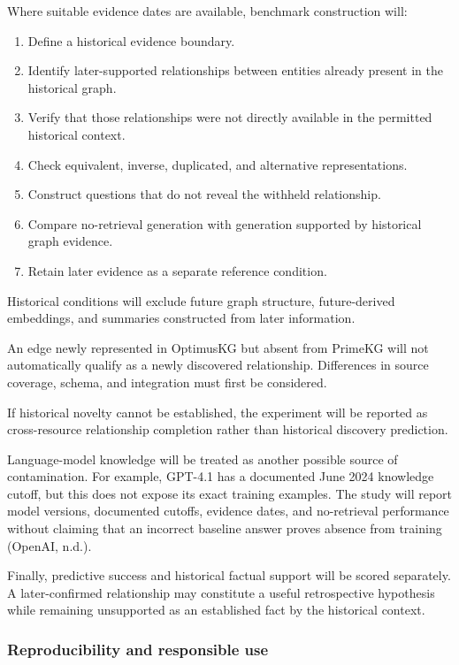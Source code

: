 Where suitable evidence dates are available, benchmark construction will:

\begin{enumerate}
\def\labelenumi{\arabic{enumi}.}
\tightlist
\item
  Define a historical evidence boundary.
\item
  Identify later-supported relationships between entities already present in the historical graph.
\item
  Verify that those relationships were not directly available in the permitted historical context.
\item
  Check equivalent, inverse, duplicated, and alternative representations.
\item
  Construct questions that do not reveal the withheld relationship.
\item
  Compare no-retrieval generation with generation supported by historical graph evidence.
\item
  Retain later evidence as a separate reference condition.
\end{enumerate}

Historical conditions will exclude future graph structure, future-derived embeddings, and summaries constructed from later information.

An edge newly represented in OptimusKG but absent from PrimeKG will not automatically qualify as a newly discovered relationship. Differences in source coverage, schema, and integration must first be considered.

If historical novelty cannot be established, the experiment will be reported as cross-resource relationship completion rather than historical discovery prediction.

Language-model knowledge will be treated as another possible source of contamination. For example, GPT-4.1 has a documented June 2024 knowledge cutoff, but this does not expose its exact training examples. The study will report model versions, documented cutoffs, evidence dates, and no-retrieval performance without claiming that an incorrect baseline answer proves absence from training (OpenAI, n.d.).

Finally, predictive success and historical factual support will be scored separately. A later-confirmed relationship may constitute a useful retrospective hypothesis while remaining unsupported as an established fact by the historical context.

\subsubsection{Reproducibility and responsible use}\label{reproducibility-and-responsible-use}

